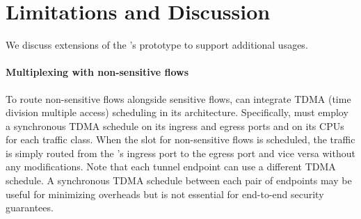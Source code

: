 \section{Limitations and Discussion}
\label{sec:discussion}

We discuss extensions of the {\sys}'s prototype to support additional usages.

\paragraph{Multiplexing with non-sensitive flows}
To route non-sensitive flows alongside sensitive flows, {\sys} can integrate
TDMA (time division multiple access) scheduling \cite{vattikonda2012tdma,
beams2021ifs} in its architecture. Specifically, {\sys} must employ a
synchronous TDMA schedule on its ingress and egress ports and on its CPUs for
each traffic class. When the slot for non-sensitive flows is scheduled, the
traffic is simply routed from the {\sys}’s ingress port to the egress port and
vice versa without any modifications.
%
Note that each tunnel endpoint can use a different TDMA schedule. A synchronous
TDMA schedule between each pair of endpoints may be useful for minimizing
overheads but is not essential for end-to-end security guarantees.
\fi

